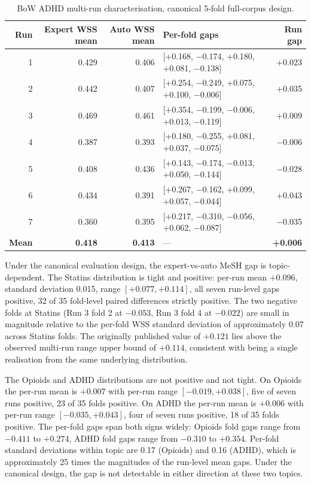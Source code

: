 \documentclass[11pt,a4paper]{article}
\begin{document}
\begin{table}[h]
\centering
\small
\begin{tabular}{rrrlr}
\toprule
Run & Expert WSS mean & Auto WSS mean & Per-fold gaps & Run gap \\
\midrule
1 & 0.429 & 0.406 & [+0.168, $-$0.174, +0.180, +0.081, $-$0.138] & +0.023 \\
2 & 0.442 & 0.407 & [+0.254, $-$0.249, +0.075, +0.100, $-$0.006] & +0.035 \\
3 & 0.469 & 0.461 & [+0.354, $-$0.199, $-$0.006, +0.013, $-$0.119] & +0.009 \\
4 & 0.387 & 0.393 & [+0.180, $-$0.255, +0.081, +0.037, $-$0.075] & $-$0.006 \\
5 & 0.408 & 0.436 & [+0.143, $-$0.174, $-$0.013, +0.050, $-$0.144] & $-$0.028 \\
6 & 0.434 & 0.391 & [+0.267, $-$0.162, +0.099, +0.057, $-$0.044] & +0.043 \\
7 & 0.360 & 0.395 & [+0.217, $-$0.310, $-$0.056, +0.062, $-$0.087] & $-$0.035 \\
\midrule
\textbf{Mean} & \textbf{0.418} & \textbf{0.413} & --- & \textbf{+0.006} \\
\bottomrule
\end{tabular}
\caption{BoW ADHD multi-run characterisation, canonical 5-fold full-corpus design.}
\label{tab:bow_adhd_multirun}
\end{table}

Under the canonical evaluation design, the expert-vs-auto MeSH gap is topic-dependent. The Statins distribution is tight and positive: per-run mean $+0.096$, standard deviation 0.015, range $[+0.077, +0.114]$, all seven run-level gaps positive, 32 of 35 fold-level paired differences strictly positive. The two negative folds at Statins (Run 3 fold 2 at $-0.053$, Run 3 fold 4 at $-0.022$) are small in magnitude relative to the per-fold WSS standard deviation of approximately 0.07 across Statins folds. The originally published value of $+0.121$ lies above the observed multi-run range upper bound of $+0.114$, consistent with being a single realisation from the same underlying distribution.

The Opioids and ADHD distributions are not positive and not tight. On Opioids the per-run mean is $+0.007$ with per-run range $[-0.019, +0.038]$, five of seven runs positive, 23 of 35 folds positive. On ADHD the per-run mean is $+0.006$ with per-run range $[-0.035, +0.043]$, four of seven runs positive, 18 of 35 folds positive. The per-fold gaps span both signs widely: Opioids fold gaps range from $-0.411$ to $+0.274$, ADHD fold gaps range from $-0.310$ to $+0.354$. Per-fold standard deviations within topic are 0.17 (Opioids) and 0.16 (ADHD), which is approximately 25 times the magnitudes of the run-level mean gaps. Under the canonical design, the gap is not detectable in either direction at these two topics.
\end{document}
